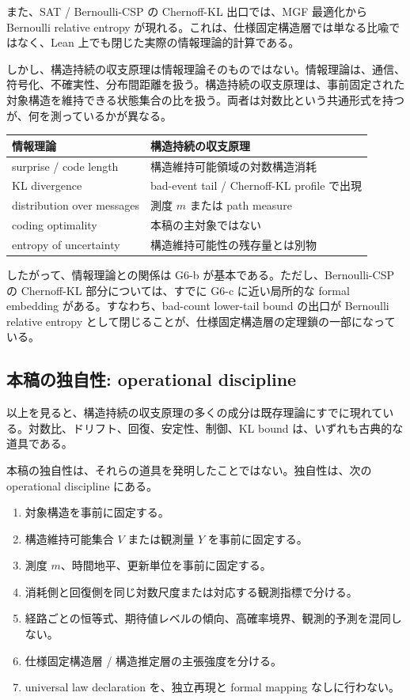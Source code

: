 \documentclass[12pt,a4paper]{article}
\begin{document}
また、SAT / Bernoulli-CSP の Chernoff-KL 出口では、MGF 最適化から Bernoulli relative entropy が現れる。これは、仕様固定構造層では単なる比喩ではなく、Lean 上でも閉じた実際の情報理論的計算である。

しかし、構造持続の収支原理は情報理論そのものではない。情報理論は、通信、符号化、不確実性、分布間距離を扱う。構造持続の収支原理は、事前固定された対象構造を維持できる状態集合の比を扱う。両者は対数比という共通形式を持つが、何を測っているかが異なる。

{\def\LTcaptype{table} %
\begin{longtable}[]{@{}ll@{}}
\toprule\noalign{}
情報理論 & 構造持続の収支原理 \\
\midrule\noalign{}
\endhead
\bottomrule\noalign{}
\endlastfoot
surprise / code length & 構造維持可能領域の対数構造消耗 \\
KL divergence & bad-event tail / Chernoff-KL profile で出現 \\
distribution over messages & 測度 \(m\) または path measure \\
coding optimality & 本稿の主対象ではない \\
entropy of uncertainty & 構造維持可能性の残存量とは別物 \\
\end{longtable}
}

したがって、情報理論との関係は G6-b が基本である。ただし、Bernoulli-CSP の Chernoff-KL 部分については、すでに G6-c に近い局所的な formal embedding がある。すなわち、bad-count lower-tail bound の出口が Bernoulli relative entropy として閉じることが、仕様固定構造層の定理鎖の一部になっている。

\subsection{本稿の独自性: operational discipline}\label{ux672cux7a3fux306eux72ecux81eaux6027-operational-discipline}

以上を見ると、構造持続の収支原理の多くの成分は既存理論にすでに現れている。対数比、ドリフト、回復、安定性、制御、KL bound は、いずれも古典的な道具である。

本稿の独自性は、それらの道具を発明したことではない。独自性は、次の operational discipline にある。

\begin{enumerate}
\def\labelenumi{\arabic{enumi}.}
\tightlist
\item
  対象構造を事前に固定する。
\item
  構造維持可能集合 \(V\) または観測量 \(Y\) を事前に固定する。
\item
  測度 \(m\)、時間地平、更新単位を事前に固定する。
\item
  消耗側と回復側を同じ対数尺度または対応する観測指標で分ける。
\item
  経路ごとの恒等式、期待値レベルの傾向、高確率境界、観測的予測を混同しない。
\item
  仕様固定構造層 / 構造推定層の主張強度を分ける。
\item
  universal law declaration を、独立再現と formal mapping なしに行わない。
\end{enumerate}
\end{document}
